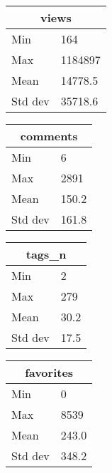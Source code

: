 \begin{tabular}{|l|l|}
\hline\multicolumn{2}{|c|}{views} \\
\hline
Min & 164 \\
Max & 1184897 \\
Mean & 14778.5\\
Std dev & 35718.6 \\
\hline
\end{tabular}

\begin{tabular}{|l|l|}
\hline\multicolumn{2}{|c|}{comments} \\
\hline
Min & 6 \\
Max & 2891 \\
Mean & 150.2\\
Std dev & 161.8 \\
\hline
\end{tabular}

\begin{tabular}{|l|l|}
\hline\multicolumn{2}{|c|}{tags_n} \\
\hline
Min & 2 \\
Max & 279 \\
Mean & 30.2\\
Std dev & 17.5 \\
\hline
\end{tabular}

\begin{tabular}{|l|l|}
\hline\multicolumn{2}{|c|}{favorites} \\
\hline
Min & 0 \\
Max & 8539 \\
Mean & 243.0\\
Std dev & 348.2 \\
\hline
\end{tabular}
